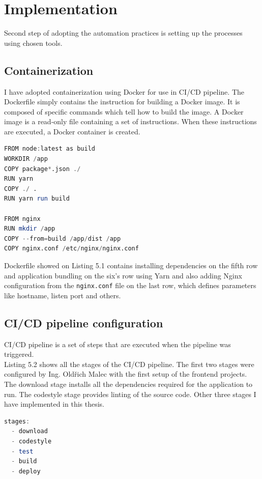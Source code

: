 \section{Implementation}\label{sec52} Second step of adopting the automation practices is setting up the processes using chosen tools.


\subsection{Containerization}  I have adopted containerization using Docker for use in CI/CD pipeline. The Dockerfile simply contains the instruction for building a Docker image. It is composed of specific commands which tell how to build the image. A Docker image is a read-only file containing a set of instructions. When these instructions are executed, a Docker container is created. 


\begin{lstlisting}[language=Octave, caption=Dockerfile]
FROM node:latest as build
WORKDIR /app
COPY package*.json ./
RUN yarn
COPY ./ .
RUN yarn run build

FROM nginx
RUN mkdir /app
COPY --from=build /app/dist /app
COPY nginx.conf /etc/nginx/nginx.conf
\end{lstlisting}

\noindent Dockerfile showed on Listing 5.1 contains installing dependencies on the fifth row and application bundling on the six's row using Yarn and also adding Nginx configuration from the \texttt{nginx.conf} file on the last row, which defines parameters like hostname, listen port and others.



\subsection{CI/CD pipeline configuration} CI/CD pipeline is a set of steps that are executed when the pipeline was triggered.\\
Listing 5.2 shows all the stages of the CI/CD pipeline. The first two stages were configured by Ing. Oldřich Malec with the first setup of the frontend projects. The download stage installs all the dependencies required for the application to run. The codestyle stage provides linting of the source code. Other three stages I have implemented in this thesis.
\begin{lstlisting}[language=Octave, caption=Gitlab CI/CD stages]
stages:
  - download
  - codestyle
  - test
  - build
  - deploy
\end{lstlisting}

